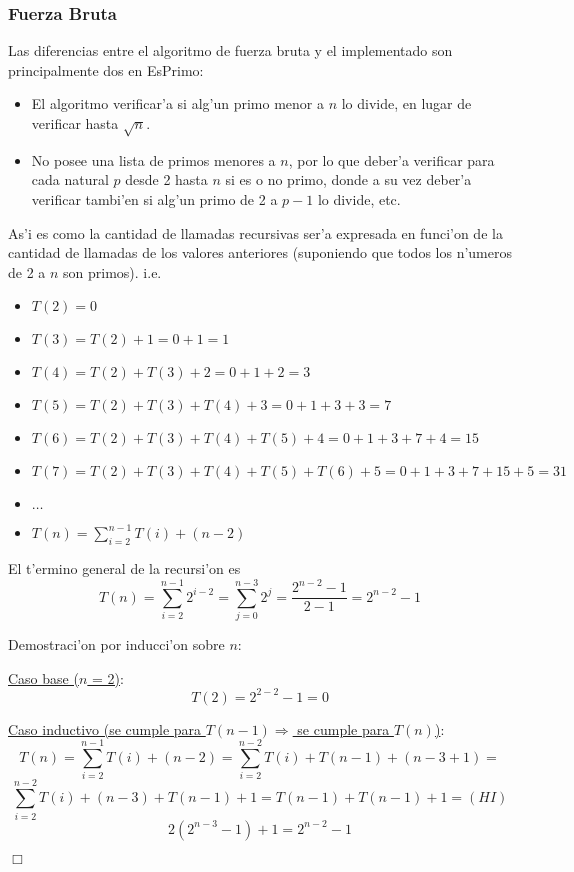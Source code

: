 \subsubsection{Fuerza Bruta}
Las diferencias entre el algoritmo de fuerza bruta y el implementado son principalmente dos en EsPrimo:
\begin{itemize}
\item El algoritmo verificar'a si alg'un primo menor a $n$ lo divide, en lugar de verificar hasta $\sqrt{n}$.
\item No posee una lista de primos menores a $n$, por lo que deber'a verificar para cada natural $p$ desde 2 hasta $n$ si es o no primo, donde a su vez deber'a verificar tambi'en si alg'un primo de 2 a $p-1$ lo divide, etc.
\end{itemize}
As'i es como la cantidad de llamadas recursivas ser'a expresada en funci'on de la cantidad de llamadas de los valores anteriores (suponiendo que todos los n'umeros de 2 a $n$ son primos). i.e.
\begin{itemize}
\item $T(2) = 0$
\item $T(3) = T(2) + 1 = 0 + 1 = 1$
\item $T(4) = T(2) + T(3) + 2 = 0 + 1 + 2 = 3$
\item $T(5) = T(2) + T(3) + T(4) + 3 = 0 + 1 + 3 + 3 = 7$
\item $T(6) = T(2) + T(3) + T(4) + T(5) + 4 = 0 + 1 + 3 + 7 + 4 = 15$
\item $T(7) = T(2) + T(3) + T(4) + T(5) + T(6) + 5 = 0 + 1 + 3 + 7 + 15 + 5 = 31$
\item $\dots$
\item $T(n) = \sum_{i=2}^{n-1}{T(i)} + (n-2)$
\end{itemize}

El t'ermino general de la recursi'on es
$$T(n) = \sum_{i=2}^{n-1}{2^{i-2}} = \sum_{j=0}^{n-3}{2^j} = \frac{2^{n-2}-1}{2-1} = 2^{n-2} - 1$$

Demostraci'on por inducci'on sobre $n$:

\underline{Caso base ($n$ = 2)}:
$$T(2) = 2^{2-2} - 1 = 0$$

\underline{Caso inductivo (se cumple para $T(n-1) \Longrightarrow$ se cumple para $T(n)$)}:
$$T(n) = \sum_{i=2}^{n-1}{T(i)} + (n-2) = \sum_{i=2}^{n-2}{T(i)} + T(n-1) + (n-3+1) =$$
$$\sum_{i=2}^{n-2}{T(i)} + (n-3) + T(n-1) + 1 = T(n-1) + T(n-1) + 1 =  (HI)$$
$$2(2^{n-3} - 1) + 1 = 2^{n-2} - 1 $$
\begin{flushright}
$\Box$   
\end{flushright}

